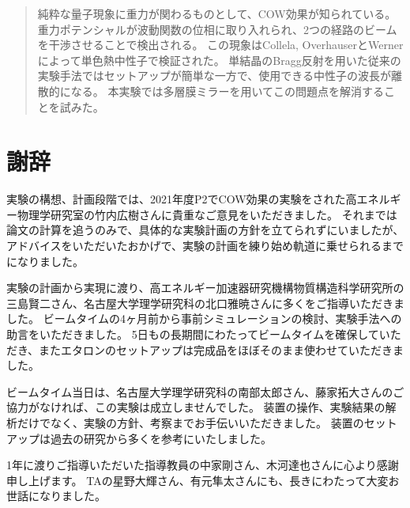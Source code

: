 \documentclass[dvipdfmx]{jsarticle}
\begin{document}
\maketitle


\begin{abstract}
    純粋な量子現象に重力が関わるものとして、COW効果が知られている。
    \cite{COWtheory}
    重力ポテンシャルが波動関数の位相に取り入れられ、2つの経路のビームを干渉させることで検出される。
    この現象はCollela, OverhauserとWernerによって単色熱中性子で検証された。
    \cite{COWexp}
    単結晶のBragg反射を用いた従来の実験手法ではセットアップが簡単な一方で、使用できる中性子の波長が離散的になる。
    本実験では多層膜ミラー\cite{Fujiie_2024}を用いてこの問題点を解消することを試みた。
\end{abstract}





\section*{謝辞}

実験の構想、計画段階では、2021年度P2でCOW効果の実験\cite{report2021}をされた高エネルギー物理学研究室の竹内広樹さんに貴重なご意見をいただきました。
それまでは論文の計算を追うのみで、具体的な実験計画の方針を立てられずにいましたが、アドバイスをいただいたおかげで、実験の計画を練り始め軌道に乗せられるまでになりました。

実験の計画から実現に渡り、高エネルギー加速器研究機構物質構造科学研究所の三島賢二さん、名古屋大学理学研究科の北口雅暁さんに多くをご指導いただきました。
ビームタイムの4ヶ月前から事前シミュレーションの検討、実験手法への助言をいただきました。
5日もの長期間にわたってビームタイムを確保していただき、またエタロンのセットアップは完成品\cite{Fujiie_2024}をほぼそのまま使わせていただきました。

ビームタイム当日は、名古屋大学理学研究科の南部太郎さん、藤家拓大さんのご協力がなければ、この実験は成立しませんでした。
装置の操作、実験結果の解析だけでなく、実験の方針、考察までお手伝いいただきました。
装置のセットアップは過去の研究から多くを参考にいたしました。

1年に渡りご指導いただいた指導教員の中家剛さん、木河達也さんに心より感謝申し上げます。
TAの星野大輝さん、有元隼太さんにも、長きにわたって大変お世話になりました。




\end{document}
